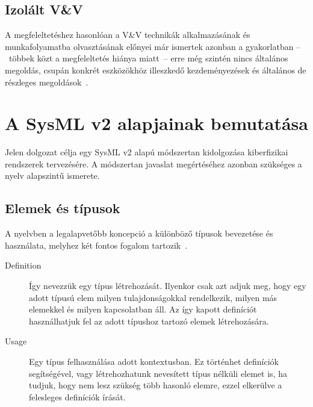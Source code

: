     \subsection{Izolált V\&V}
    A megfeleltetéshez hasonlóan a V\&V technikák alkalmazásának és munkafolyamatba olvasztásának előnyei már ismertek azonban a gyakorlatban --~többek közt a megfeleltetés hiánya miatt~-- erre még szintén nincs általános megoldás, csupán konkrét eszközökhöz illeszkedő kezdeményezések és általános de részleges megoldások~\cite{Ma_2022}.

\section{A SysML v2 alapjainak bemutatása}
Jelen dolgozat célja egy SysML v2 alapú módszertan kidolgozása kiberfizikai rendszerek tervezésére.
A módszertan javaslat megértéséhez azonban szükséges a nyelv alapszintű ismerete.

    \subsection{Elemek és típusok}
    A nyelvben a legalapvetőbb koncepció a különböző típusok bevezetése és használata, melyhez két fontos fogalom tartozik~\cite{Bajaj_2022}.
    \begin{description}
        \item[Definition] Így nevezzük egy típus létrehozását. Ilyenkor csak azt adjuk meg, hogy egy adott típusú elem milyen tulajdonságokkal rendelkezik, milyen más elemekkel és milyen kapcsolatban áll. Az így kapott definíciót használhatjuk fel az adott típushoz tartozó elemek létrehozására.
        \item[Usage] Egy típus felhasználása adott kontextusban. Ez történhet definíciók segítségével, vagy létrehozhatunk nevesített típus nélküli elemet is, ha tudjuk, hogy nem lesz szükség több hasonló elemre, ezzel elkerülve a felesleges definíciók írását.
    \end{description}

